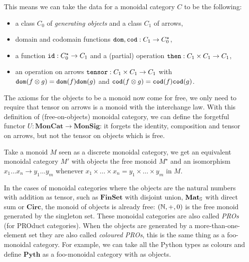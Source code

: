 This means we can take the data for a monoidal category $C$ to be the following:
\begin{itemize}
\item a class $C_0$ of \emph{generating objects} and a class $C_1$ of arrows,
\item domain and codomain functions $\dom, \cod : C_1 \to C_0^\star$,
\item a function $\id : C_0^\star \to C_1$ and a (partial) operation $\then : C_1 \times C_1 \to C_1$,
\item an operation on arrows $\tensor : C_1 \times C_1 \to C_1$ with $\dom (f \otimes g) = \dom(f) \dom(g)$ and $\cod (f \otimes g) = \cod(f) \cod(g)$.
\end{itemize}
The axioms for the objects to be a monoid now come for free, we only need to require that tensor on arrows is a monoid with the interchange law.
With this definition of (free-on-objects) monoidal category, we can define the forgetful functor $U : \mathbf{MonCat} \to \mathbf{MonSig}$: it forgets the identity, composition and tensor on arrows, but not the tensor on objects which is free.

\begin{example}
Take a monoid $M$ seen as a discrete monoidal category, we get an equivalent monoidal category $M'$ with objects the free monoid $M^\star$ and an isomorphism $x_1 \dots x_n \to y_1 \dots y_m$ whenever $x_1 \times \dots \times x_n = y_1 \times \dots \times y_m$ in $M$.
\end{example}

In the cases of monoidal categories where the objects are the natural numbers with addition as tensor, such as $\mathbf{FinSet}$ with disjoint union, $\mathbf{Mat}_\S$ with direct sum or $\mathbf{Circ}$, the monoid of objects is already free: $(\N, +, 0)$ is the free monoid generated by the singleton set.
These monoidal categories are also called \emph{PROs} (for PROduct categories).
When the objects are generated by a more-than-one-element set they are also called \emph{coloured PROs}, this is the same thing as a foo-monoidal category.
For example, we can take all the Python types as colours and define $\mathbf{Pyth}$ as a foo-monoidal category with  as objects.

